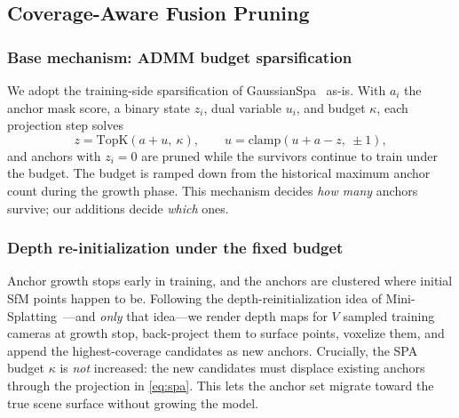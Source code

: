 \documentclass[conference]{IEEEtran}
\begin{document}
\subsection{Coverage-Aware Fusion Pruning}
\label{sec:fusion}

\subsubsection{Base mechanism: ADMM budget sparsification}
We adopt the training-side sparsification of GaussianSpa~\cite{zhang2025gaussianspa}
as-is. With $a_i$ the anchor mask score, a binary state $z_i$, dual variable $u_i$,
and budget $\kappa$, each projection step solves
\begin{equation}
z=\mathrm{TopK}(a+u,\ \kappa),\qquad
u=\mathrm{clamp}\!\left(u+a-z,\ \pm 1\right),
\label{eq:spa}
\end{equation}
and anchors with $z_i=0$ are pruned while the survivors continue to train under the
budget. The budget is ramped down from the historical maximum anchor count during
the growth phase. This mechanism decides \emph{how many} anchors survive; our
additions decide \emph{which} ones.

\subsubsection{Depth re-initialization under the fixed budget}
Anchor growth stops early in training, and the anchors are clustered where initial
SfM points happen to be. Following the depth-reinitialization idea of
Mini-Splatting~\cite{fang2024}---and \emph{only} that idea---we render depth maps
for $V$ sampled training cameras at growth stop, back-project them to surface
points, voxelize them, and append the highest-coverage candidates as new anchors.
Crucially, the SPA budget $\kappa$ is \emph{not} increased: the new candidates must
displace existing anchors through the projection in \eqref{eq:spa}. This lets the
anchor set migrate toward the true scene surface without growing the model.
\end{document}
